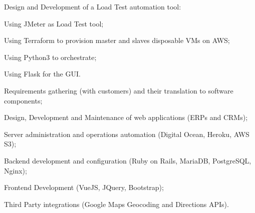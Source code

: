 \documentclass[]{deedy-resume-openfont}
\begin{document}
\begin{minipage}[t]{0.65\textwidth}
\vspace{\topsep} %
Design and Development of a Load Test automation tool:\\
\begin{tightemize}
	\item Using JMeter as Load Test tool;
	\item Using Terraform to provision master and slaves disposable VMs on AWS;
	\item Using Python3 to orchestrate;
	\item Using Flask for the GUI.
\end{tightemize}
\sectionsep

\begin{tightemize}
\item Requirements gathering (with customers) and their translation to software components;
\item Design, Development and Maintenance of web applications (ERPs and CRMs);
\item Server administration and operations automation (Digital Ocean, Heroku, AWS S3);
\item Backend development and configuration (Ruby on Rails, MariaDB, PostgreSQL, Nginx);
\item Frontend Development (VueJS, JQuery, Bootstrap);
\item Third Party integrations (Google Maps Geocoding and Directions APIs).
\end{tightemize}
\sectionsep

\begin{comment}
\section{Personal Projects}
\runsubsection{Marvin}
\descript{| Ethereum Backed Webapp (PoC) }
\location{https://github.com/353swe/Marvin-353}
\runsubsection{giadatanghetti.it}
\descript{| Jeckyll website for Music Therapist}
\location{https://github.com/gmarraff/giadatanghetti.it}
\runsubsection{Runnersalo}
\descript{| My fist attempt on web development}
\location{https://runnersalo.org/}
\sectionsep
\end{comment}
\begin{comment}

\end{comment}
\end{minipage}
\end{document}
